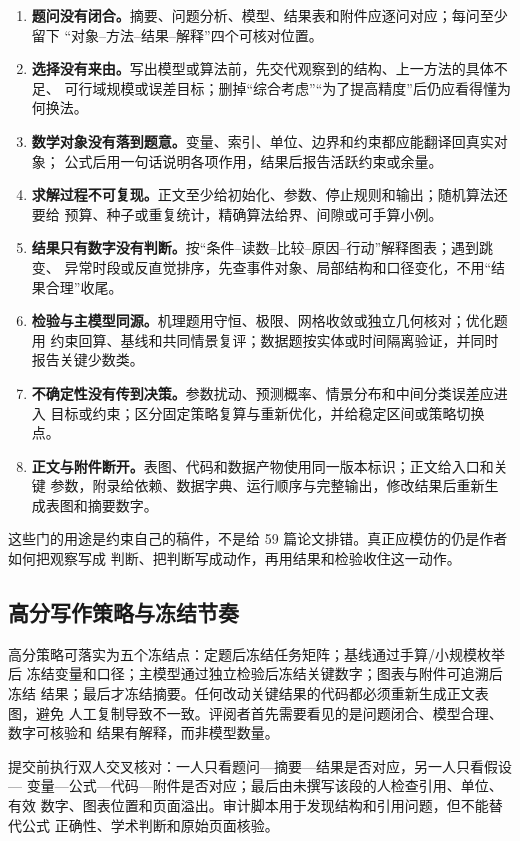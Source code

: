\documentclass[UTF8,a4paper,12pt]{ctexart}
\begin{document}
\begin{enumerate}
  \item \textbf{题问没有闭合。}摘要、问题分析、模型、结果表和附件应逐问对应；每问至少留下
  “对象--方法--结果--解释”四个可核对位置。
  \item \textbf{选择没有来由。}写出模型或算法前，先交代观察到的结构、上一方法的具体不足、
  可行域规模或误差目标；删掉“综合考虑”“为了提高精度”后仍应看得懂为何换法。
  \item \textbf{数学对象没有落到题意。}变量、索引、单位、边界和约束都应能翻译回真实对象；
  公式后用一句话说明各项作用，结果后报告活跃约束或余量。
  \item \textbf{求解过程不可复现。}正文至少给初始化、参数、停止规则和输出；随机算法还要给
  预算、种子或重复统计，精确算法给界、间隙或可手算小例。
  \item \textbf{结果只有数字没有判断。}按“条件--读数--比较--原因--行动”解释图表；遇到跳变、
  异常时段或反直觉排序，先查事件对象、局部结构和口径变化，不用“结果合理”收尾。
  \item \textbf{检验与主模型同源。}机理题用守恒、极限、网格收敛或独立几何核对；优化题用
  约束回算、基线和共同情景复评；数据题按实体或时间隔离验证，并同时报告关键少数类。
  \item \textbf{不确定性没有传到决策。}参数扰动、预测概率、情景分布和中间分类误差应进入
  目标或约束；区分固定策略复算与重新优化，并给稳定区间或策略切换点。
  \item \textbf{正文与附件断开。}表图、代码和数据产物使用同一版本标识；正文给入口和关键
  参数，附录给依赖、数据字典、运行顺序与完整输出，修改结果后重新生成表图和摘要数字。
\end{enumerate}

这些门的用途是约束自己的稿件，不是给 59 篇论文排错。真正应模仿的仍是作者如何把观察写成
判断、把判断写成动作，再用结果和检验收住这一动作。
\subsection{高分写作策略与冻结节奏}

高分策略可落实为五个冻结点：定题后冻结任务矩阵；基线通过手算/小规模枚举后
冻结变量和口径；主模型通过独立检验后冻结关键数字；图表与附件可追溯后冻结
结果；最后才冻结摘要。任何改动关键结果的代码都必须重新生成正文表图，避免
人工复制导致不一致。评阅者首先需要看见的是问题闭合、模型合理、数字可核验和
结果有解释，而非模型数量。

提交前执行双人交叉核对：一人只看题问—摘要—结果是否对应，另一人只看假设—
变量—公式—代码—附件是否对应；最后由未撰写该段的人检查引用、单位、有效
数字、图表位置和页面溢出。审计脚本用于发现结构和引用问题，但不能替代公式
正确性、学术判断和原始页面核验。
\end{document}

